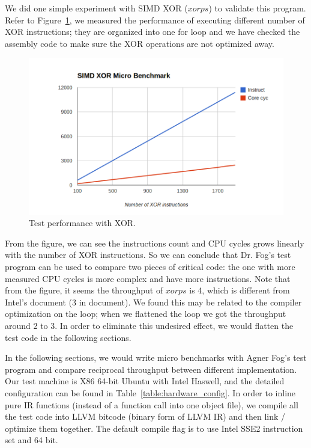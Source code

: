 We did one simple experiment with SIMD XOR ($xorps$) to validate this program. Refer to Figure~\ref{figure:testp_xor}, we measured the performance of executing different number of XOR instructions; they are organized into one for loop and we have checked the assembly code to make sure the XOR operations are not optimized away.

\begin{figure}[ht!]
\centering
\includegraphics[width=140mm]{draw/testp_xor.png}
\caption[Test Performance with XOR]{Test performance with XOR\@.}
\label{figure:testp_xor}
\end{figure}

From the figure, we can see the instructions count and CPU cycles grows linearly with the number of XOR instructions. So we can conclude that Dr. Fog's test program can be used to compare two pieces of critical code: the one with more measured CPU cycles is more complex and have more instructions. Note that from the figure, it seems the throughput of $xorps$ is 4, which is different from Intel's document (3 in document). We found this may be related to the compiler optimization on the loop; when we flattened the loop we got the throughput around 2 to 3. In order to eliminate this undesired effect, we would flatten the test code in the following sections.

In the following sections, we would write micro benchmarks with Agner Fog's test program and compare reciprocal throughput between different implementation. Our test machine is X86 64-bit Ubuntu with Intel Haswell, and the detailed configuration can be found in Table~\ref{table:hardware_config}. In order to inline pure IR functions (instead of a function call into one object file), we compile all the test code into LLVM bitcode (binary form of LLVM IR) and then link / optimize them together. The default compile flag is to use Intel SSE2 instruction set and 64 bit.

